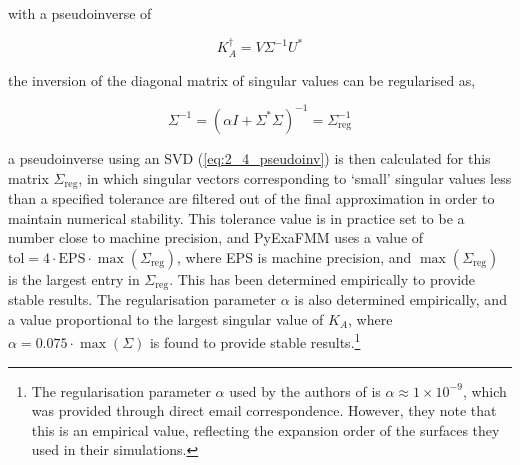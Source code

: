 with a pseudoinverse of

\begin{equation}
    K_A^\dagger = V \Sigma^{-1} U^*
    \label{eq:2_4_pseudoinv}
\end{equation}

the inversion of the diagonal matrix of singular values can be regularised as,

\begin{equation}
    \Sigma^{-1} = (\alpha I + \Sigma^*\Sigma)^{-1} = \Sigma_{\text{reg}}^{-1}
    \label{eq:2_4_regularised_general_operator}
\end{equation}

a pseudoinverse using an \gls{SVD} (\ref{eq:2_4_pseudoinv}) is then calculated
for this matrix $\Sigma_{\text{reg}}$, in which singular vectors corresponding
to `small' singular values less than a specified tolerance are filtered out of
the final approximation in order to maintain numerical stability. This tolerance
value is in practice set to be a number close
to machine precision, and \gls{PyExaFMM} uses a value of $\text{tol} = 4 \cdot \text{EPS} \cdot \max (\Sigma_{\text{reg}})$,
where EPS is machine precision, and $\max (\Sigma_{\text{reg}})$ is the largest
entry in $\Sigma_{\text{reg}}$. This has been determined empirically to provide
stable results. The regularisation parameter $\alpha$ is also determined empirically,
and a value proportional to the largest singular value of $K_A$, where
$\alpha=0.075 \cdot \max(\Sigma)$ is found to provide stable results.\footnote{
    The regularisation parameter $\alpha$ used by the authors of \cite{Malhotra:2015:CCP}
    is $\alpha \approx  1 \times 10^{-9}$, which was provided through direct email correspondence. However,
    they note that this is an empirical value, reflecting the expansion order of
    the surfaces they used in their simulations.
}


